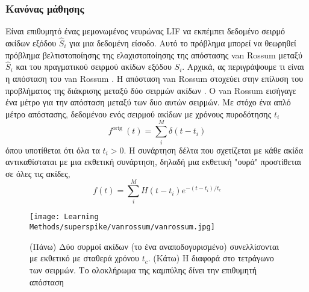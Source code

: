 \documentclass[12pt]{report}
\begin{document}
\subsubsection{Κανόνας μάθησης}
Είναι επιθυμητό ένας μεμονωμένος νευρώνας LIF να εκπέμπει δεδομένο σειρμό ακίδων εξόδου $\hat{S}_{i}$ για μια δεδομένη είσοδο. Αυτό το πρόβλημα μπορεί να θεωρηθεί πρόβλημα βελτιστοποίησης της ελαχιστοποίησης της απόστασης \textlatin{van Rossum} \cite{rossum2001} μεταξύ $\hat{S}_{i}$ και του πραγματικού σειρμού ακίδων εξόδου $S_{i}$. Αρχικά, ας περιγράψουμε τι είναι η απόσταση του \textlatin{van Rossum} . Η απόσταση \textlatin{van Rossum} στοχεύει στην επίλυση του προβλήματος της διάκρισης μεταξύ δύο σειρμών ακίδων . Ο  \textlatin{van Rossum} εισήγαγε ένα μέτρο για την απόσταση μεταξύ των δυο αυτών σειρμών.
Με στόχο ένα απλό μέτρο απόστασης, δεδομένου ενός σειρμού ακίδων με χρόνους πυροδότησης $t_{i}$
\begin{equation}
f^{\text {orig }}(t)=\sum_{i}^{M} \delta\left(t-t_{i}\right)
\end{equation}
όπου υποτίθεται ότι όλα τα $t_{i}>0$. Η συνάρτηση δέλτα που σχετίζεται με κάθε ακίδα αντικαθίσταται με μια εκθετική συνάρτηση, δηλαδή μια εκθετική "ουρά" προστίθεται σε όλες τις ακίδες,
\begin{equation}
f(t)=\sum_{i}^{M} H\left(t-t_{i}\right) e^{-\left(t-t_{i}\right) / t_{c}}
\end{equation}
\begin{figure}[htp]
    \centering
    \texttt{[image: Learning Methods/superspike/vanrossum/vanrossum.jpg]}
    \caption{(Πάνω) Δύο συρμοί ακίδων (το ένα αναποδογυρισμένο) συνελλίσονται με εκθετικό με σταθερά χρόνου $t_{c}$. (Κάτω) Η διαφορά στο τετράγωνο των σειρμών. Το ολοκλήρωμα της καμπύλης δίνει την επιθυμητή απόσταση
    \cite{rossum2001}
}
    \label{fig:vanrossum}
\end{figure}
\end{document}
